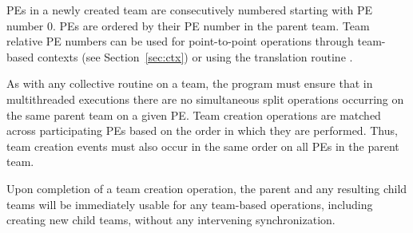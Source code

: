 \acp{PE} in a newly created team are consecutively numbered starting with
\ac{PE} number 0. \acp{PE} are ordered by their \ac{PE} number in
the parent team. Team relative \ac{PE}
numbers can be used for point-to-point operations through team-based
contexts (see Section~\ref{sec:ctx}) or using the translation routine
.

As with any collective routine on a team, the program must ensure that in multithreaded executions there
are no simultaneous split operations occurring on the same parent team on a
given \ac{PE}.
Team creation operations are matched across participating PEs based
on the order in which they are performed. Thus, team creation events must also
occur in the same order on all \acp{PE} in the parent team.

Upon completion of a team creation operation, the parent and any resulting child teams
will be immediately usable for any team-based operations, including creating new child
teams, without any intervening synchronization.
